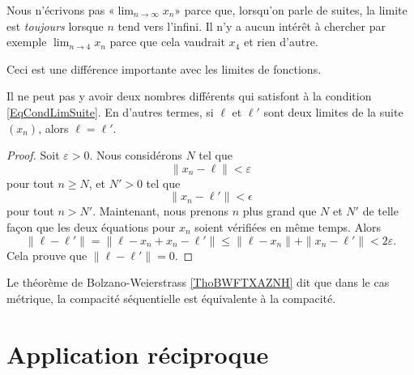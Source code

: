 \begin{remark}
	Nous n'écrivons pas «$\lim_{n\to\infty}x_n$» parce que, lorsqu'on parle de suites, la limite est \emph{toujours} lorsque $n$ tend vers l'infini. Il n'y a aucun intérêt à chercher par exemple $\lim_{n\to 4}x_n$ parce que cela vaudrait $x_4$ et rien d'autre.

	Ceci est une différence importante avec les limites de fonctions.
\end{remark}

\begin{lemma}
	Il ne peut pas y avoir deux nombres différents qui satisfont à la condition \eqref{EqCondLimSuite}. En d'autres termes, si $\ell$ et $\ell'$ sont deux limites de la suite $(x_n)$, alors $\ell=\ell'$.
\end{lemma}

\begin{proof}
	Soit $\varepsilon>0$. Nous considérons $N$ tel que
	\begin{equation}
		\| x_n-\ell \|<\varepsilon
	\end{equation}
	pour tout $n\geq N$, et $N'>0$ tel que 
	\begin{equation}
		\| x_n-\ell' \|<\epsilon
	\end{equation}
	pour tout $n>N'$. Maintenant, nous prenons $n$ plus grand que $N$ et $N'$ de telle façon que les deux équations pour $x_n$ soient vérifiées en même temps. Alors
	\begin{equation}
		\| \ell-\ell' \|=\| \ell-x_n+x_n-\ell' \|\leq\| \ell-x_n \|+\| x_n-\ell' \|<2\varepsilon.
	\end{equation}
	Cela prouve que $\| \ell-\ell' \|=0$.
\end{proof}
Le théorème de Bolzano-Weierstrass \ref{ThoBWFTXAZNH} dit que dans le cas métrique, la compacité séquentielle est équivalente à la compacité.


\section{Application réciproque}

